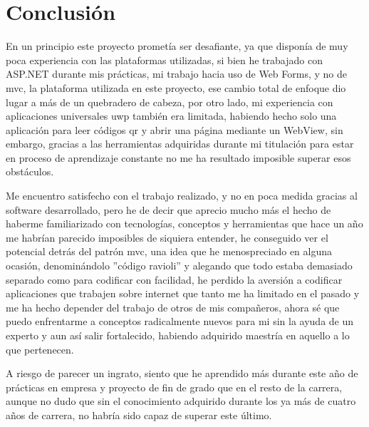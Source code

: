 \chapter{Conclusión}

En un principio este proyecto prometía ser desafiante, ya que disponía de muy poca experiencia con las plataformas utilizadas, si bien he trabajado con ASP.NET durante mis prácticas, mi trabajo hacia uso de Web Forms, y no de \acrshort{mvc}, la plataforma utilizada en este proyecto, ese cambio total de enfoque dio lugar a más de un quebradero de cabeza, por otro lado, mi experiencia con aplicaciones universales \acrshort{uwp} también era limitada, habiendo hecho solo una aplicación para leer códigos \acrshort{qr} y abrir una página mediante un WebView, sin embargo, gracias a las herramientas adquiridas durante mi titulación para estar en proceso de aprendizaje constante no me ha resultado imposible superar esos obstáculos.

Me encuentro satisfecho con el trabajo realizado, y no en poca medida gracias al software desarrollado, pero he de decir que aprecio mucho más el hecho de haberme familiarizado con tecnologías, conceptos y herramientas que hace un año me habrían parecido imposibles de siquiera entender, he conseguido ver el potencial detrás del patrón \acrshort{mvc}, una idea que he menospreciado en alguna ocasión, denominándolo ''código ravioli'' y alegando que todo estaba demasiado separado como para codificar con facilidad, he perdido la aversión a codificar aplicaciones que trabajen sobre internet que tanto me ha limitado en el pasado y me ha hecho depender del trabajo de otros de mis compañeros, ahora sé que puedo enfrentarme a conceptos radicalmente nuevos para mi sin la ayuda de un experto y aun así salir fortalecido, habiendo adquirido maestría en aquello a lo que pertenecen.

A riesgo de parecer un ingrato, siento que he aprendido más durante este año de prácticas en empresa y proyecto de fin de grado que en el resto de la carrera, aunque no dudo que sin el conocimiento adquirido durante los ya más de cuatro años de carrera, no habría sido capaz de superar este último.
